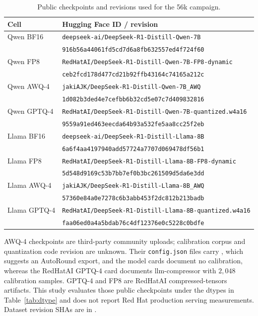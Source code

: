 \documentclass[11pt,a4paper]{article}
\begin{document}
\begin{table}[!htbp]
\centering
\caption{Public checkpoints and revisions used for the 56k campaign.}
\label{tab:checkpoints}
{\footnotesize
\begin{tabular}{lp{}}
\toprule
\textbf{Cell} & \textbf{Hugging Face ID / revision} \\
\midrule
Qwen BF16 & \texttt{deepseek-ai/DeepSeek-R1-Distill-Qwen-7B}\\
 & \texttt{916b56a44061fd5cd7d6a8fb632557ed4f724f60} \\
Qwen FP8 & \texttt{RedHatAI/DeepSeek-R1-Distill-Qwen-7B-FP8-dynamic}\\
 & \texttt{ceb2fcd178d477cd21b92ffb43164c74165a212c} \\
Qwen AWQ-4 & \texttt{jakiAJK/DeepSeek-R1-Distill-Qwen-7B\_AWQ}\\
 & \texttt{1d082b3ded4e7cefbb6b32cd5e07c7d409832816} \\
Qwen GPTQ-4 & \texttt{RedHatAI/DeepSeek-R1-Distill-Qwen-7B-quantized.w4a16}\\
 & \texttt{9559a91ed463eecda64b93a532fe5aa8cc25f2eb} \\
Llama BF16 & \texttt{deepseek-ai/DeepSeek-R1-Distill-Llama-8B}\\
 & \texttt{6a6f4aa4197940add57724a7707d069478df56b1} \\
Llama FP8 & \texttt{RedHatAI/DeepSeek-R1-Distill-Llama-8B-FP8-dynamic}\\
 & \texttt{5d548d9169c53b7bb7ef0b3bc261509d5da6e3dd} \\
Llama AWQ-4 & \texttt{jakiAJK/DeepSeek-R1-Distill-Llama-8B\_AWQ}\\
 & \texttt{57360e84a0e7278c6b3abb453f2dc812b213badb} \\
Llama GPTQ-4 & \texttt{RedHatAI/DeepSeek-R1-Distill-Llama-8B-quantized.w4a16}\\
 & \texttt{faa06ed0a4a5bdab76c4df12376e0c5228c0bdfe} \\
\bottomrule
\end{tabular}
}
\end{table}

AWQ-4 checkpoints are third-party community uploads; calibration corpus and quantization code revision are unknown. Their \texttt{config.json} files carry  , which suggests an AutoRound export, and the model cards document no calibration, whereas the RedHatAI GPTQ-4 card documents llm-compressor with $2{,}048$ calibration samples. GPTQ-4 and FP8 are RedHatAI compressed-tensors artifacts. This study evaluates those public checkpoints under the dtypes in Table~\ref{tab:dtype} and does not report Red Hat production serving measurements. Dataset revision SHAs are in .
\end{document}
